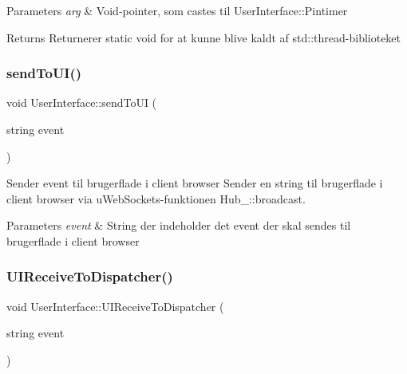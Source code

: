 \begin{DoxyParams}{Parameters}
{\em arg} & Void-\/pointer, som castes til User\+Interface\+::\+Pintimer \\
\hline
\end{DoxyParams}
\begin{DoxyReturn}{Returns}
Returnerer static void for at kunne blive kaldt af std\+::thread-\/biblioteket 
\end{DoxyReturn}
\mbox{\label{classUserInterface_a44b574eb614bb90bb370f027ce88b8ea}} 
\subsubsection{\texorpdfstring{send\+To\+U\+I()}{sendToUI()}}
{\footnotesize\ttfamily void User\+Interface\+::send\+To\+UI (\begin{DoxyParamCaption}\item[{string}]{event }\end{DoxyParamCaption})}



Sender event til brugerflade i client browser Sender en string til brugerflade i client browser via u\+Web\+Sockets-\/funktionen Hub\+\_\+\+::broadcast. 


\begin{DoxyParams}{Parameters}
{\em event} & String der indeholder det event der skal sendes til brugerflade i client browser \\
\hline
\end{DoxyParams}
\mbox{\label{classUserInterface_a5a42468e90a1bbd89f6465ee11d56e93}} 
\subsubsection{\texorpdfstring{U\+I\+Receive\+To\+Dispatcher()}{UIReceiveToDispatcher()}}
{\footnotesize\ttfamily void User\+Interface\+::\+U\+I\+Receive\+To\+Dispatcher (\begin{DoxyParamCaption}\item[{string}]{event }\end{DoxyParamCaption})}



